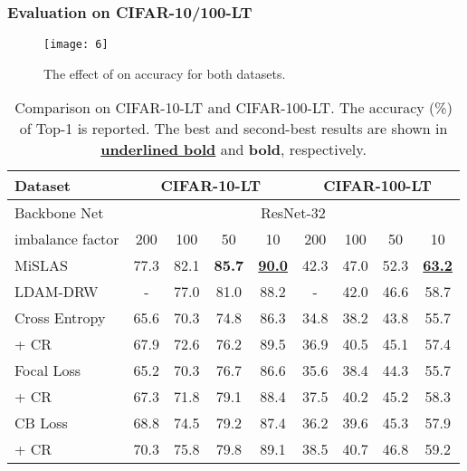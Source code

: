 \documentclass[10pt,twocolumn,letterpaper]{article}
\begin{document}
\subsubsection{Evaluation on CIFAR-10/100-LT}

\begin{figure}[t]
\centering
\centerline{\texttt{[image: 6]}}
\vskip -0.16in
\caption{The effect of  on accuracy for both datasets.}
\label{fig7}
\vskip -0.09in
\end{figure}


\begin{table}[t]
\caption{Comparison on CIFAR-10-LT and CIFAR-100-LT. The accuracy (\%) of Top-1 is reported. The best and second-best results are shown in \underline{\textbf{underlined bold}} and \textbf{bold}, respectively.}
\label{table1}
\vskip -0.07in
\centering  
\begin{small}
\renewcommand\arraystretch{1.05}
\setlength{\tabcolsep}{2.3pt} \begin{tabular}{l|cccc|cccc}
\hline \toprule 
Dataset   &\multicolumn{4}{c|}{CIFAR-10-LT}   &\multicolumn{4}{c}{CIFAR-100-LT}  \\ \hline
Backbone Net  &\multicolumn{8}{c}{ResNet-32} \\ \hline
imbalance factor   &200   &100   &50   &10  &200   &100   &50   &10 \\ \hline
MiSLAS \cite{paper1}  &77.3  &82.1 &\textbf{85.7} &\underline{\textbf{90.0}} &42.3 &47.0 &52.3 & \underline{\textbf{63.2}}    \\ 
LDAM-DRW \cite{paper2}  & \multicolumn{1}{c}{-}  &77.0 &81.0 &88.2 & \multicolumn{1}{c}{-} &42.0 &46.6 & 58.7   \\ \hline

Cross Entropy   & 65.6  &70.3  &74.8  &86.3   &34.8  & 38.2   & 43.8   &55.7   \\ 
\rowcolor{blue!5}+ CR     & 67.9  &72.6  &76.2  &89.5   &36.9  & 40.5   & 45.1   &57.4  \\  \hline

Focal Loss \cite{paper3} & 65.2  &70.3  &76.7  &86.6   &35.6  & 38.4   & 44.3   &55.7   \\ 
\rowcolor{blue!5}+ CR   & 67.3  &71.8  &79.1  &88.4   &37.5  & 40.2   & 45.2   &58.3   \\  \hline

CB Loss \cite{paper4} & 68.8  &74.5  &79.2  &87.4   &36.2  & 39.6   & 45.3   &57.9   \\ 
\rowcolor{blue!5}+ CR     & 70.3  &75.8  &79.8  &89.1   &38.5  & 40.7   & 46.8   &59.2   \\  \hline


\end{tabular}
\end{small}
\end{table}
\end{document}
